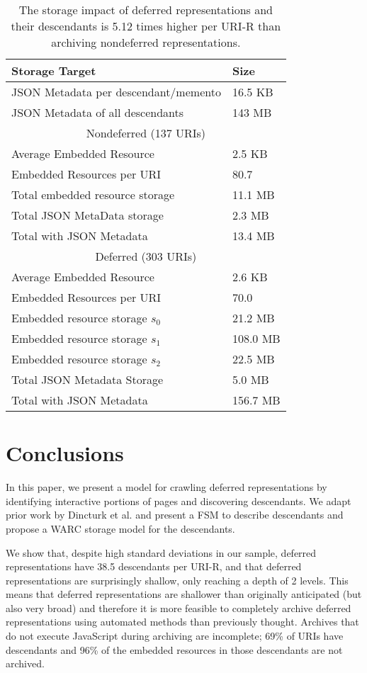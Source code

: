 \documentclass{sig-alternate}
\begin{document}
\begin{table}
\centering
\begin{tabular}{p{5cm} | p{2cm}}
\textbf{Storage Target} & \textbf{Size} \\
\hline
\hline
JSON Metadata per descendant/memento & 16.5 KB \\
JSON Metadata of all descendants & 143 MB \\
\hline 
\multicolumn{2}{c}{Nondeferred (137 URIs)}\\
\hline
Average Embedded Resource & 2.5 KB\\
Embedded Resources per URI & 80.7 \\
Total embedded resource storage & 11.1 MB\\
Total JSON MetaData storage & 2.3 MB\\
Total with JSON Metadata & 13.4 MB\\
\hline 
\multicolumn{2}{c}{Deferred (303 URIs)}\\
\hline
Average Embedded Resource & 2.6 KB\\
Embedded Resources per URI & 70.0 \\
Embedded resource storage $s_0$ & 21.2 MB\\
Embedded resource storage $s_1$ & 108.0 MB\\
Embedded resource storage $s_2$ & 22.5 MB\\
Total JSON Metadata Storage & 5.0 MB \\
Total with JSON Metadata & 156.7 MB \\
\hline
\end{tabular}
  \caption{The storage impact of deferred representations and their descendants is 5.12 times higher per URI-R than archiving nondeferred representations.}
  \label{storages}
\end{table}


\section{Conclusions}
In this paper, we present a model for crawling deferred representations by identifying interactive portions of pages and discovering descendants. We adapt prior work by Dincturk et al. and present a FSM to describe descendants and propose a WARC storage model for the descendants.

We show that, despite high standard deviations in our sample, deferred representations have 38.5 descendants per URI-R, and that deferred representations are surprisingly shallow, only reaching a depth of 2 levels. This means that deferred representations are shallower than originally anticipated (but also very broad) and therefore it is more feasible to completely archive deferred representations using automated methods than previously thought. Archives that do not execute JavaScript during archiving are incomplete; 69\% of URIs have descendants and 96\% of the embedded resources in those descendants are not archived.
\end{document}
